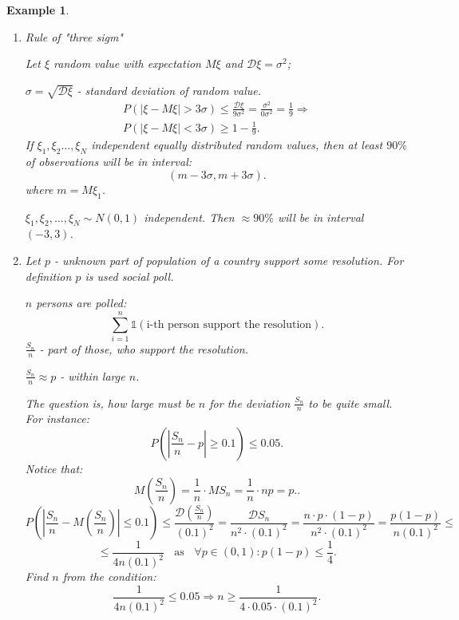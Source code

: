 \documentclass[12pt,letterpaper]{report}
\newtheorem*{example}{Example}
\begin{document}
\begin{example}
    \begin{enumerate}
        \item Rule of "three sigm"

            Let $\xi$ random value with expectation $M\xi$ and $\mathcal{D}\xi = \sigma^2$;

            $\sigma = \sqrt{\mathcal{D}\xi}$ - standard deviation of random value.
            \begin{gather*}
                P(|\xi - M\xi| > 3 \sigma) \leq \frac{\mathcal{D}\xi}{9\sigma^2} = \frac{\sigma^2}{ 0 \sigma^2} = \frac{1}{9} \Rightarrow \\ 
                P(|\xi - M\xi| < 3\sigma) \geq 1 - \frac{1}{9}.
            \end{gather*}
            If $\xi_1, \xi_2 \dots, \xi_N$ independent equally distributed random values, then at least $90\%$ of observations will be in interval:
            \[
                (m - 3\sigma, m + 3\sigma)
            .\] where $m = M\xi_1$.

            $\xi_1, \xi_2, \dots, \xi_N \sim N(0,1)$ independent.
            Then $\approx 90\%$ will be in interval $(-3, 3)$.

        \item Let $p$ - unknown part of population of a country support some resolution. For definition $p$ is used social poll.

            $n$ persons are polled:
            \[
                \sum_{i=1}^{n}\mathds{1}(\text{i-th person support the resolution})
            .\] 
            $\frac{S_n}{n}$ - part of those, who support the resolution.

            $\frac{S_n}{n} \approx p$ - within large $n$.

            The question is, how large must be $n$ for the deviation $\frac{S_n}{n}$ to be quite small.
            For instance:
            \[
                P\left( \left| \frac{S_n}{n} - p \right| \geq 0.1 \right) \leq 0.05
            .\] 
            Notice that:
            \[
                M\left( \frac{S_n}{n} \right) = \frac{1}{n} \cdot MS_n = \frac{1}{n} \cdot np = p.
            .\] 
            \[
                P \left( \left| \frac{S_n}{n} - M \left(\frac{S_n}{n}\right) \right| \leq 0.1 \right) \leq \frac{\mathcal{D} \left(\frac{S_n}{n}\right)}{(0.1)^2} = \frac{\mathcal{D}S_n}{n^2 \cdot (0.1)^2} = \frac{n\cdot p \cdot (1-p)}{n^2 \cdot (0.1)^2} = \frac{p(1-p)}{n(0.1)^2} \leq
            \] 
            \[
                \leq \frac{1}{4n (0.1)^2} \;\; \text{ as }  \;\; 
                \forall p \in (0,1): p(1-p) \leq \frac{1}{4}
            .\] 
            Find $n$ from the condition:
            \[
                \frac{1}{4n(0.1)^2} \leq 0.05 \Rightarrow n \geq \frac{1}{4 \cdot 0.05 \cdot (0.1)^2}
            .\] 
    \end{enumerate}
\end{example}
\end{document}
